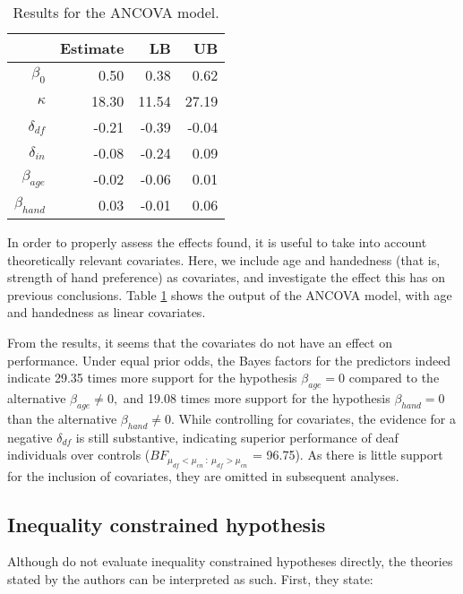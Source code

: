 \begin{table}[btp]
\centering
\caption{Results for the ANCOVA model.} 
\label{ANCOVATable}
\begin{tabular}{rrrr}
  \toprule
 & Estimate & LB & UB \\ 
  \midrule
$\beta_0$ & 0.50 & 0.38 & 0.62 \\ 
  $\kappa$ & 18.30 & 11.54 & 27.19 \\ 
  $\delta_{df}$ & -0.21 & -0.39 & -0.04 \\ 
  $\delta_{in}$ & -0.08 & -0.24 & 0.09 \\ 
  $\beta_{age}$ & -0.02 & -0.06 & 0.01 \\ 
  $\beta_{hand}$ & 0.03 & -0.01 & 0.06 \\ 
   \bottomrule
\end{tabular}
\end{table}


In order to properly assess the effects found, it is useful to take into account theoretically relevant covariates. Here, we include age and handedness (that is, strength of hand preference) as covariates, and investigate the effect this has on previous conclusions. Table \ref{ANCOVATable} shows the output of the ANCOVA model, with age and handedness as linear covariates.

From the results, it seems that the covariates do not have an effect on performance. Under equal prior odds, the Bayes factors for the predictors indeed indicate 29.35 times more support for the hypothesis \( \beta_{age} = 0 \) compared to the alternative \( \beta_{age} \neq 0, \) and 19.08 times more support for the hypothesis \( \beta_{hand} = 0\) than the alternative \( \beta_{hand} \neq 0.\) While controlling for covariates, the evidence for a negative \( \delta_{df}\) is still substantive, indicating superior performance of deaf individuals over controls (\(BF_{\mu_{df} < \mu_{cn} ~ : ~ \mu_{df} > \mu_{cn}} \) = 96.75). As there is little support for the inclusion of covariates, they are omitted in subsequent analyses.


\subsection{Inequality constrained hypothesis} \label{complexineq}

Although \citet{van2013superior} do not evaluate inequality constrained hypotheses directly, the theories stated by the authors can be interpreted as such. First, they state:

